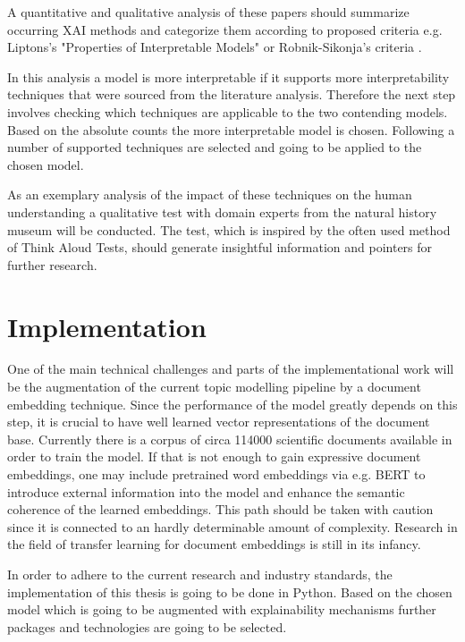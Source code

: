 \documentclass[pdftex,a4paper,12pt]{scrartcl}
\begin{document}
A quantitative and qualitative analysis of these papers should summarize occurring XAI methods and categorize them according to proposed criteria e.g. Liptons's "Properties of Interpretable Models" \cite{liptonMythosModelInterpretability2016} or Robnik-Sikonja's criteria \cite{robnik-sikonjaPerturbationBasedExplanationsPrediction2018}.

In this analysis a model is more interpretable if it supports more interpretability techniques that were sourced from the literature analysis. Therefore the next step involves checking which techniques are applicable to the two contending models. Based on the absolute counts the more interpretable model is chosen. Following a number of supported techniques are selected and going to be applied to the chosen model.

As an exemplary analysis of the impact of these techniques on the human understanding a qualitative test with domain experts from the natural history museum will be conducted. The test, which is inspired by the often used method of Think Aloud Tests, should generate insightful information and pointers for further research.



\section{Implementation}

One of the main technical challenges and parts of the implementational work will be the augmentation of the current topic modelling pipeline by a document embedding technique. Since the performance of the model greatly depends on this step, it is crucial to have well learned vector representations of the document base. Currently there is a corpus of circa 114000 scientific documents available in order to train the model. If that is not enough to gain expressive document embeddings, one may include pretrained word embeddings via e.g. BERT \cite{devlinBERTPretrainingDeep2018} to introduce external information into the model and enhance the semantic coherence of the learned embeddings. This path should be taken with caution since it is connected to an hardly determinable amount of complexity. Research in the field of transfer learning for document embeddings is still in its infancy.

In order to adhere to the current research and industry standards, the implementation of this thesis is going to be done in Python. Based on the chosen model which is going to be augmented with explainability mechanisms further packages and technologies are going to be selected.
\end{document}
